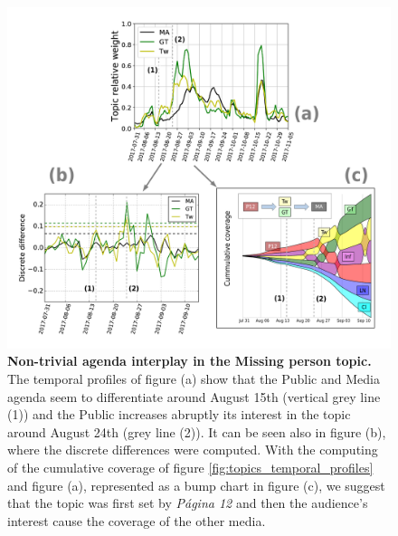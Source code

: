 \documentclass{bmcart}
\begin{document}
\begin{backmatter}
\begin{figure}[h!]
\includegraphics[width = \textwidth]{Fig8.pdf}
\caption{\textbf{Non-trivial agenda interplay in the Missing person topic.}
The temporal profiles of figure (a) show that the Public and Media agenda seem to differentiate around August 15th (vertical grey line (1)) and the Public increases abruptly its interest in the topic around August 24th (grey line (2)). It can be seen also in figure (b), where the discrete differences were computed. 
With the computing of the cumulative coverage of figure \ref{fig:topics_temporal_profiles} and figure (a), represented as a bump chart in figure (c), we suggest that the topic was first set by \emph{P\'agina 12} and then the audience's interest cause the coverage of the other media.
}
\label{fig:Maldonado_setagenda}
\end{figure}


\end{backmatter}
\end{document}
